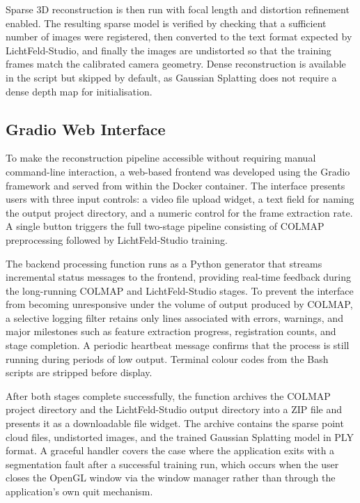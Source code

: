 \documentclass[conference]{IEEEtran}
\begin{document}
Sparse 3D reconstruction is then run with focal length and distortion refinement enabled. The resulting sparse model is verified by checking that a sufficient number of images were registered, then converted to the text format expected by LichtFeld-Studio, and finally the images are undistorted so that the training frames match the calibrated camera geometry. Dense reconstruction is available in the script but skipped by default, as Gaussian Splatting does not require a dense depth map for initialisation.

\subsection{Gradio Web Interface}

To make the reconstruction pipeline accessible without requiring manual command-line interaction, a web-based frontend was developed using the Gradio framework and served from within the Docker container. The interface presents users with three input controls: a video file upload widget, a text field for naming the output project directory, and a numeric control for the frame extraction rate. A single button triggers the full two-stage pipeline consisting of COLMAP preprocessing followed by LichtFeld-Studio training.

The backend processing function runs as a Python generator that streams incremental status messages to the frontend, providing real-time feedback during the long-running COLMAP and LichtFeld-Studio stages. To prevent the interface from becoming unresponsive under the volume of output produced by COLMAP, a selective logging filter retains only lines associated with errors, warnings, and major milestones such as feature extraction progress, registration counts, and stage completion. A periodic heartbeat message confirms that the process is still running during periods of low output. Terminal colour codes from the Bash scripts are stripped before display.

After both stages complete successfully, the function archives the COLMAP project directory and the LichtFeld-Studio output directory into a ZIP file and presents it as a downloadable file widget. The archive contains the sparse point cloud files, undistorted images, and the trained Gaussian Splatting model in PLY format. A graceful handler covers the case where the application exits with a segmentation fault after a successful training run, which occurs when the user closes the OpenGL window via the window manager rather than through the application's own quit mechanism.
\end{document}
